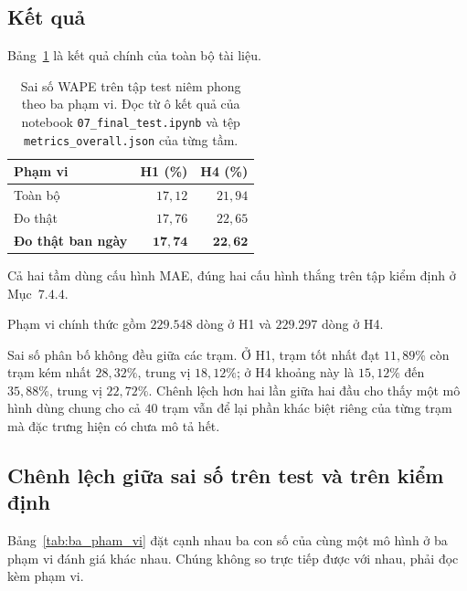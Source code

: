 \documentclass[12pt, a4paper]{report}
\begin{document}
\subsection{Kết quả}

Bảng~\ref{tab:ket_qua_test} là kết quả chính của toàn bộ tài liệu.

\begin{table}[htbp]
\centering
\caption{Sai số WAPE trên tập test niêm phong theo ba phạm vi. Đọc từ ô kết quả của notebook
\texttt{07\_final\_test.ipynb} và tệp \texttt{metrics\_overall.json} của từng tầm.}
\label{tab:ket_qua_test}
\small
\begin{tabular}{l r r}
\toprule
\textbf{Phạm vi} & \textbf{H1 (\%)} & \textbf{H4 (\%)} \\
\midrule
Toàn bộ                   & $17{,}12$ & $21{,}94$ \\
Đo thật                   & $17{,}76$ & $22{,}65$ \\
\textbf{Đo thật ban ngày} & $\mathbf{17{,}74}$ & $\mathbf{22{,}62}$ \\
\bottomrule
\end{tabular}
\caption[Sai số WAPE trên tập test niêm phong theo ba phạm vi]{Sai số WAPE trên tập test niêm phong theo ba phạm vi. Đọc từ ô kết quả của notebook
\texttt{07\_final\_test.ipynb} và tệp \texttt{metrics\_overall.json} của từng tầm.}
\label{tab:ket_qua_test}
\end{table}

Cả hai tầm dùng cấu hình MAE, đúng hai cấu hình thắng trên tập kiểm định ở Mục~$7.4.4$.

Phạm vi chính thức gồm $229.548$ dòng ở H1 và $229.297$ dòng ở H4.

Sai số phân bố không đều giữa các trạm. Ở H1, trạm tốt nhất đạt $11{,}89\%$ còn trạm kém nhất
$28{,}32\%$, trung vị $18{,}12\%$; ở H4 khoảng này là $15{,}12\%$ đến $35{,}88\%$, trung vị
$22{,}72\%$. Chênh lệch hơn hai lần giữa hai đầu cho thấy một mô hình dùng chung cho cả $40$
trạm vẫn để lại phần khác biệt riêng của từng trạm mà đặc trưng hiện có chưa mô tả hết.

\FloatBarrier
\subsection{Chênh lệch giữa sai số trên test và trên kiểm định}

Bảng~\ref{tab:ba_pham_vi} đặt cạnh nhau ba con số của cùng một mô hình ở ba phạm vi đánh giá
khác nhau. Chúng không so trực tiếp được với nhau, phải đọc kèm phạm vi.
\end{document}
